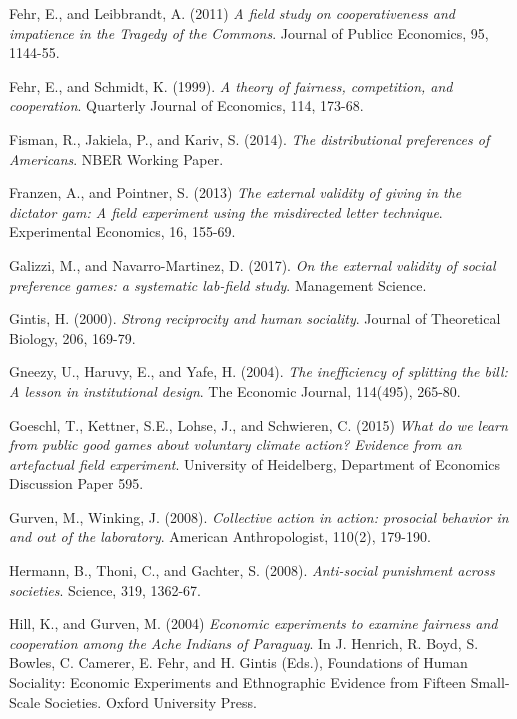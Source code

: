 \documentclass{article}
\begin{document}
\begin{thebibliography}{9}
Fehr, E., and Leibbrandt, A. (2011)
\textit{A field study on cooperativeness and impatience in the Tragedy of the Commons}.
Journal of Publicc Economics, 95, 1144-55.

Fehr, E., and Schmidt, K. (1999).
\textit{A theory of fairness, competition, and cooperation}.
Quarterly Journal of Economics, 114, 173-68.

Fisman, R., Jakiela, P., and Kariv, S. (2014).
\textit{The distributional preferences of Americans}.
NBER Working Paper.

Franzen, A., and Pointner, S. (2013)
\textit{The external validity of giving in the dictator gam: A field experiment using the misdirected letter technique}.
Experimental Economics, 16, 155-69.

Galizzi, M., and Navarro-Martinez, D. (2017).
\textit{On the external validity of social preference games: a systematic lab-field study}.
Management Science.

Gintis, H. (2000).
\textit{Strong reciprocity and human sociality}.
Journal of Theoretical Biology, 206, 169-79.

Gneezy, U., Haruvy, E., and Yafe, H. (2004).
\textit{The inefficiency of splitting the bill: A lesson in institutional design}.
The Economic Journal, 114(495), 265-80.

Goeschl, T., Kettner, S.E., Lohse, J., and Schwieren, C. (2015)
\textit{What do we learn from public good games about voluntary climate action? Evidence from an artefactual field experiment}.
University of Heidelberg, Department of Economics Discussion Paper 595.

Gurven, M., Winking, J. (2008).
\textit{Collective action in action: prosocial behavior in and out of the laboratory}.
American Anthropologist, 110(2), 179-190. 

Hermann, B., Thoni, C., and Gachter, S. (2008).
\textit{Anti-social punishment across societies}.
Science, 319, 1362-67.

Hill, K., and Gurven, M. (2004)
\textit{Economic experiments to examine fairness and cooperation among the Ache Indians of Paraguay}.
In J. Henrich, R. Boyd, S. Bowles, C. Camerer, E. Fehr, and H. Gintis (Eds.),
Foundations of Human Sociality: Economic Experiments and Ethnographic Evidence from Fifteen Small-Scale Societies. Oxford University Press.


\end{thebibliography}
\end{document}
